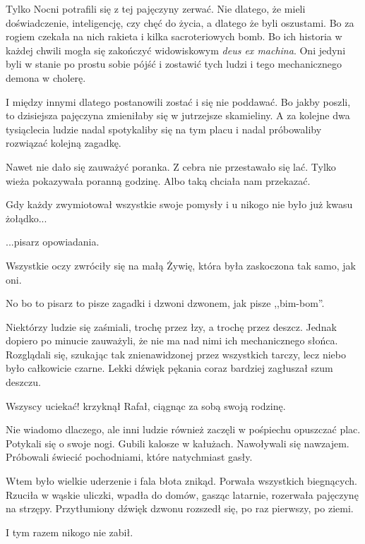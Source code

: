 Tylko Nocni potrafili się z tej pajęczyny zerwać.
Nie dlatego, że mieli doświadczenie, inteligencję, czy chęć do życia, a dlatego że byli oszustami.
Bo za rogiem czekała na nich rakieta i kilka sacroteriowych bomb.
Bo ich historia w każdej chwili mogła się zakończyć widowiskowym \emph{deus ex machina}.
Oni jedyni byli w stanie po prostu sobie pójść i zostawić tych ludzi i tego mechanicznego demona w cholerę.

I między innymi dlatego postanowili zostać i się nie poddawać.
Bo jakby poszli, to dzisiejsza pajęczyna zmieniłaby się w jutrzejsze skamieliny.
A za kolejne dwa tysiąclecia ludzie nadal spotykaliby się na tym placu i nadal próbowaliby rozwiązać kolejną zagadkę.

Nawet nie dało się zauważyć poranka.
Z cebra nie przestawało się lać.
Tylko wieża pokazywała poranną godzinę. Albo taką chciała nam przekazać.

Gdy każdy zwymiotował wszystkie swoje pomysły i u nikogo nie było już kwasu żołądko...
\begin{dialogue}
	\ds{} ...pisarz opowiadania.
\end{dialogue}
Wszystkie oczy zwróciły się na małą Żywię, która była zaskoczona tak samo, jak oni.
\begin{dialogue}
	\ds{} No bo to pisarz to pisze zagadki i dzwoni dzwonem, jak pisze ,,bim-bom''.
\end{dialogue}
Niektórzy ludzie się zaśmiali, trochę przez łzy, a trochę przez deszcz.
Jednak dopiero po minucie zauważyli, że nie ma nad nimi ich mechanicznego słońca.
Rozglądali się, szukając tak znienawidzonej przez wszystkich tarczy, lecz niebo było całkowicie czarne.
Lekki dźwięk pękania coraz bardziej zagłuszał szum deszczu.
\begin{dialogue}
	\ds{} Wszyscy uciekać! \dm{} krzyknął Rafał, ciągnąc za sobą swoją rodzinę.
\end{dialogue}
Nie wiadomo dlaczego, ale inni ludzie również zaczęli w pośpiechu opuszczać plac.
Potykali się o swoje nogi.
Gubili kalosze w kałużach.
Nawoływali się nawzajem.
Próbowali świecić pochodniami, które natychmiast gasły.

Wtem było wielkie uderzenie i fala błota znikąd.  
Porwała wszystkich biegnących.
Rzuciła w wąskie uliczki, wpadła do domów, gasząc latarnie, rozerwała pajęczynę na strzępy.
Przytłumiony dźwięk dzwonu rozszedł się, po raz pierwszy, po ziemi.

I tym razem nikogo nie zabił.


















